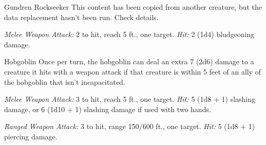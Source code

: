 \documentclass[10pt,a4paper,twoside,bg=print,twocolumn,openany,nodeprecatedcode]{dndbook}
\begin{document}
\begin{DndMonster}[float=t]{Gundren Rockseeker}
\DndMonsterBasics[
armor-class = {10},
hit-points = {\DndDice{1d8}},
speed = {30 ft.}
]
\DndMonsterAbilityScores[
 str = 10,
 dex = 10,
 con = 10,
 int = 10,
 wis = 10,
 cha = 10
]
\DndMonsterDetails[
languages = {any one language (usually Common)},
challenge = 0,
]
This content has been copied from another creature, but the data replacement hasn't been run. Check details.

\textsl{Melee Weapon Attack:} 2 to hit, reach 5 ft., one target. \textsl{Hit:} 2 (1d4) bludgeoning damage.

\end{DndMonster}



\begin{DndMonster}[float=t]{Hobgoblin}
\DndMonsterBasics[
armor-class = {18 (\textit{chain mail})},
hit-points = {\DndDice{2d8 + 2}},
speed = {30 ft.}
]
\DndMonsterAbilityScores[
 str = 13,
 dex = 12,
 con = 12,
 int = 10,
 wis = 10,
 cha = 9
]
\DndMonsterDetails[
senses = {darkvision 60 ft., passive perception 10},
languages = {Common, Goblin},
challenge = 1/2,
]
Once per turn, the hobgoblin can deal an extra 7 (2d6) damage to a creature it hits with a weapon attack if that creature is within 5 feet of an ally of the hobgoblin that isn't incapacitated.

\textsl{Melee Weapon Attack:} 3 to hit, reach 5 ft., one target. \textsl{Hit:} 5 (1d8 + 1) slashing damage, or 6 (1d10 + 1) slashing damage if used with two hands.

\textsl{Ranged Weapon Attack:} 3 to hit, range 150/600 ft., one target. \textsl{Hit:} 5 (1d8 + 1) piercing damage.

\end{DndMonster}
\end{document}
